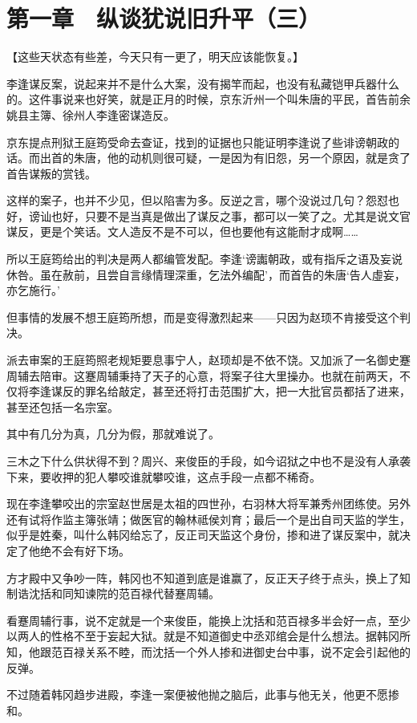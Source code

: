 \section{第一章　纵谈犹说旧升平（三）}

【这些天状态有些差，今天只有一更了，明天应该能恢复。】

李逢谋反案，说起来并不是什么大案，没有揭竿而起，也没有私藏铠甲兵器什么的。这件事说来也好笑，就是正月的时候，京东沂州一个叫朱唐的平民，首告前余姚县主簿、徐州人李逢密谋造反。

京东提点刑狱王庭筠受命去查证，找到的证据也只能证明李逢说了些诽谤朝政的话。而出首的朱唐，他的动机则很可疑，一是因为有旧怨，另一个原因，就是贪了首告谋叛的赏钱。

这样的案子，也并不少见，但以陷害为多。反逆之言，哪个没说过几句？怨怼也好，谤讪也好，只要不是当真是做出了谋反之事，都可以一笑了之。尤其是说文官谋反，更是个笑话。文人造反不是不可以，但也要他有这能耐才成啊……

所以王庭筠给出的判决是两人都编管发配。李逢‘谤讟朝政，或有指斥之语及妄说休咎。虽在赦前，且尝自言缘情理深重，乞法外编配’，而首告的朱唐‘告人虛妄，亦乞施行。’

但事情的发展不想王庭筠所想，而是变得激烈起来——只因为赵顼不肯接受这个判决。

派去审案的王庭筠照老规矩要息事宁人，赵顼却是不依不饶。又加派了一名御史蹇周辅去陪审。这蹇周辅秉持了天子的心意，将案子往大里操办。也就在前两天，不仅将李逢谋反的罪名给敲定，甚至还将打击范围扩大，把一大批官员都括了进来，甚至还包括一名宗室。

其中有几分为真，几分为假，那就难说了。

三木之下什么供状得不到？周兴、来俊臣的手段，如今诏狱之中也不是没有人承袭下来，要收押的犯人攀咬谁就攀咬谁，这点手段一点都不稀奇。

现在李逢攀咬出的宗室赵世居是太祖的四世孙，右羽林大将军兼秀州团练使。另外还有试将作监主簿张靖；做医官的翰林祗侯刘育；最后一个是出自司天监的学生，似乎是姓秦，叫什么韩冈给忘了，反正司天监这个身份，掺和进了谋反案中，就决定了他绝不会有好下场。

方才殿中又争吵一阵，韩冈也不知道到底是谁赢了，反正天子终于点头，换上了知制诰沈括和同知谏院的范百禄代替蹇周辅。

看蹇周辅行事，说不定就是一个来俊臣，能换上沈括和范百禄多半会好一点，至少以两人的性格不至于妄起大狱。就是不知道御史中丞邓绾会是什么想法。据韩冈所知，他跟范百禄关系不睦，而沈括一个外人掺和进御史台中事，说不定会引起他的反弹。

不过随着韩冈趋步进殿，李逢一案便被他抛之脑后，此事与他无关，他更不愿掺和。

